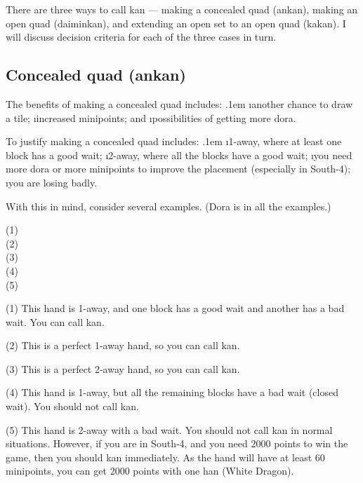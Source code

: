 There are three ways to call {\jap kan} --- making a concealed quad ({\jap ankan}), making an open quad ({\jap daiminkan}), and extending an open set to an open quad ({\jap kakan}). I will discuss decision criteria for each of the three cases in turn.

\bigskip
\subsection{Concealed quad ({\jap ankan})}
The benefits of making a concealed quad includes:
\bi \itemsep.1em
\i another chance to draw a tile;
\i increased minipoints; and
\i possibilities of getting more {\jap dora}.
\ei

To justify making a concealed quad includes:
\bi \itemsep.1em
\i 1-away, where at least one block has a good wait;
\i 2-away, where all the blocks have a good wait;
\i you need more {\jap dora} or more minipoints to improve the placement (especially in South-4);
\i you are losing badly.
\ei

With this in mind, consider several examples. ({\jap Dora} is {\LARGE\xi} in all the examples.)

\bp
{\small (1)}
\bei\bei\bei\bei\\
{\small (2)}
\bei\bei\bei\bei\\
\newpage
{\small (3)}
\bei\bei\bei\bei\\
{\small (4)}
\bei\bei\bei\bei\bai\\
{\small (5)}
\bei\bei\bei\bei\bai\bai\\
\ep

\bigskip
\noindent (1) This hand is 1-away, and one block has a good wait and another has a bad wait. You can call {\jap kan}. 

\bigskip
\noindent (2) This is a perfect 1-away hand, so you can call {\jap kan}.

\bigskip
\noindent (3) This is a perfect 2-away hand, so you can call {\jap kan}.

\bigskip
\noindent (4) This hand is 1-away, but all the remaining blocks have a bad wait (closed wait). You should not call {\jap kan}.

\bigskip
\noindent (5) This hand is 2-away with a bad wait. You should not call {\jap kan} in normal situations. However, if you are in South-4, and you need 2000 points to win the game, then you should {\jap kan} immediately. As the hand will have at least 60 minipoints, you can get 2000 points with one {\jap han} (White Dragon). 

